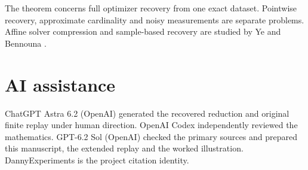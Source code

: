 \documentclass[11pt,a4paper]{amsart}
\begin{document}
The theorem concerns full optimizer recovery from one exact dataset. Pointwise recovery, approximate cardinality and noisy measurements are separate problems. Affine solver compression and sample-based recovery are studied by Ye and Bennouna \cite{compression}.

\section*{AI assistance}
ChatGPT Astra 6.2 (OpenAI) generated the recovered reduction and original finite replay under human direction. OpenAI Codex independently reviewed the mathematics. GPT-6.2 Sol (OpenAI) checked the primary sources and prepared this manuscript, the extended replay and the worked illustration. DannyExperiments is the project citation identity.



\end{document}
